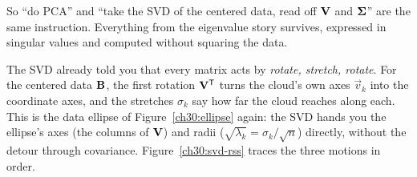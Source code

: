 So ``do PCA'' and ``take the SVD of the centered data, read off $\mathbf{V}$ and
$\mathbf{\Sigma}$'' are the same instruction. Everything from the eigenvalue story
survives, expressed in singular values and computed without squaring
the data.

\begin{intuitionbox}
The SVD already told you that every matrix acts by \emph{rotate, stretch, rotate}.
For the centered data $\mathbf{B}$, the first rotation $\mathbf{V}^{\mathsf{T}}$ turns the cloud's own
axes $\vec v_k$ into the coordinate axes, and the stretches $\sigma_k$ say how far the
cloud reaches along each. This is the data ellipse of Figure~\ref{ch30:ellipse}
again: the SVD hands you the ellipse's axes (the columns of $\mathbf{V}$) and radii
($\sqrt{\lambda_k}=\sigma_k/\sqrt n$) directly, without the detour through
covariance. Figure~\ref{ch30:svd-rss} traces the three motions in order.
\end{intuitionbox}

